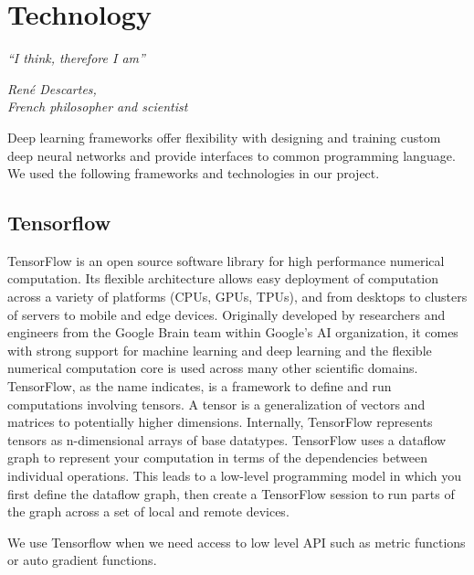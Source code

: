 \chapter{Technology}\label{ch:technology}
\epigraph{\textit{\normalsize“I think, therefore I am”}}{\textit{ \normalsize René Descartes,\\ French philosopher and scientist}}
Deep learning frameworks offer flexibility with designing and training custom deep neural networks and provide interfaces to common programming language. We used the following frameworks and technologies in our project.

\section{Tensorflow} %
\label{sec:tensorflow}
TensorFlow is an open source software library for high performance numerical computation. Its flexible architecture allows easy deployment of computation across a variety of platforms (CPUs, GPUs, TPUs), and from desktops to clusters of servers to mobile and edge devices. Originally developed by researchers and engineers from the Google Brain team within Google’s AI organization, it comes with strong support for machine learning and deep learning and the flexible numerical computation core is used across many other scientific domains. TensorFlow, as the name indicates, is a framework to define and run computations involving tensors. A tensor is a generalization of vectors and matrices to potentially higher dimensions. Internally, TensorFlow represents tensors as n-dimensional arrays of base datatypes. TensorFlow uses a dataflow graph to represent your computation in terms of the dependencies between individual operations. This leads to a low-level programming model in which you first define the dataflow graph, then create a TensorFlow session to run parts of the graph across a set of local and remote devices.\par\bigskip
We use Tensorflow when we need access to low level API such as metric functions or auto gradient functions.

